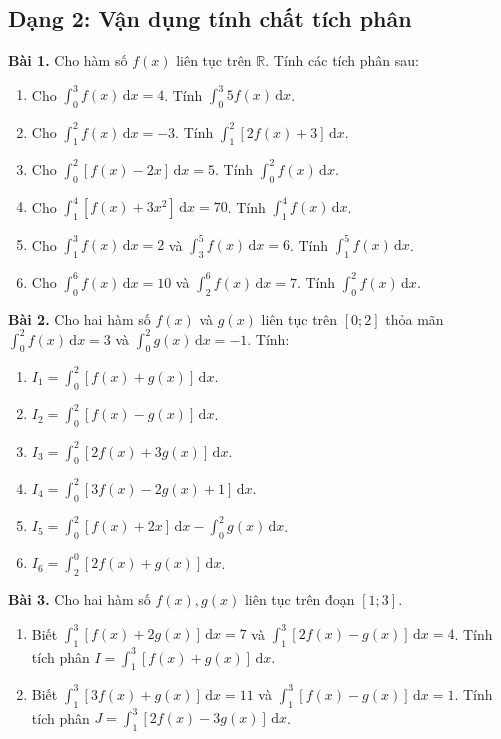 \documentclass[12pt]{article}
\begin{document}
	\subsection{Dạng 2: Vận dụng tính chất tích phân}
	\begin{btxanh}
		\textbf{Bài 1.} Cho hàm số $f(x)$ liên tục trên $\mathbb{R}$. Tính các tích phân sau:
		\begin{enumerate}[label=\alph*)]
			\item Cho $\displaystyle \int_0^3 f(x)\,\mathrm{d}x = 4$. Tính $\displaystyle \int_0^3 5f(x)\,\mathrm{d}x$.
			\item Cho $\displaystyle \int_1^2 f(x)\,\mathrm{d}x = -3$. Tính $\displaystyle \int_1^2 [2f(x) + 3]\,\mathrm{d}x$.
			\item Cho $\displaystyle \int_0^2 [f(x) - 2x]\,\mathrm{d}x = 5$. Tính $\displaystyle \int_0^2 f(x)\,\mathrm{d}x$.
			\item Cho $\displaystyle \int_1^4 [f(x) + 3x^2]\,\mathrm{d}x = 70$. Tính $\displaystyle \int_1^4 f(x)\,\mathrm{d}x$.
			\item Cho $\displaystyle \int_1^3 f(x)\,\mathrm{d}x = 2$ và $\displaystyle \int_3^5 f(x)\,\mathrm{d}x = 6$. Tính $\displaystyle \int_1^5 f(x)\,\mathrm{d}x$.
			\item Cho $\displaystyle \int_0^6 f(x)\,\mathrm{d}x = 10$ và $\displaystyle \int_2^6 f(x)\,\mathrm{d}x = 7$. Tính $\displaystyle \int_0^2 f(x)\,\mathrm{d}x$.
		\end{enumerate}
		
		\textbf{Bài 2.} Cho hai hàm số $f(x)$ và $g(x)$ liên tục trên $[0; 2]$ thỏa mãn $\displaystyle \int_0^2 f(x)\,\mathrm{d}x = 3$ và $\displaystyle \int_0^2 g(x)\,\mathrm{d}x = -1$. Tính:
		\begin{enumerate}[label=\alph*)]
			\item $I_1 = \displaystyle \int_0^2 [f(x) + g(x)]\,\mathrm{d}x$.
			\item $I_2 = \displaystyle \int_0^2 [f(x) - g(x)]\,\mathrm{d}x$.
			\item $I_3 = \displaystyle \int_0^2 [2f(x) + 3g(x)]\,\mathrm{d}x$.
			\item $I_4 = \displaystyle \int_0^2 [3f(x) - 2g(x) + 1]\,\mathrm{d}x$.
			\item $I_5 = \displaystyle \int_0^2 [f(x) + 2x]\,\mathrm{d}x - \int_0^2 g(x)\,\mathrm{d}x$.
			\item $I_6 = \displaystyle \int_2^0 [2f(x) + g(x)]\,\mathrm{d}x$.
		\end{enumerate}
		
		\textbf{Bài 3.} Cho hai hàm số $f(x), g(x)$ liên tục trên đoạn $[1; 3]$.
		\begin{enumerate}[label=\alph*)]
			\item Biết $\displaystyle \int_1^3 [f(x) + 2g(x)]\,\mathrm{d}x = 7$ và $\displaystyle \int_1^3 [2f(x) - g(x)]\,\mathrm{d}x = 4$. Tính tích phân $I = \displaystyle \int_1^3 [f(x) + g(x)]\,\mathrm{d}x$.
			\item Biết $\displaystyle \int_1^3 [3f(x) + g(x)]\,\mathrm{d}x = 11$ và $\displaystyle \int_1^3 [f(x) - g(x)]\,\mathrm{d}x = 1$. Tính tích phân $J = \displaystyle \int_1^3 [2f(x) - 3g(x)]\,\mathrm{d}x$.
		\end{enumerate}
	\end{btxanh}
	
\end{document}
